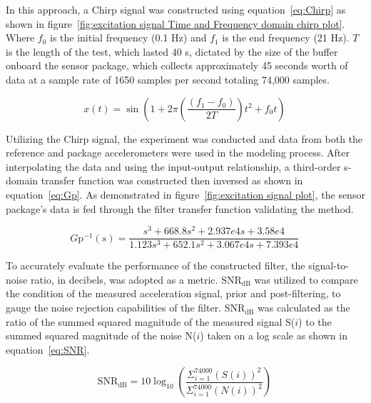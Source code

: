 \documentclass[]{spie}  %
\begin{document}
	In this approach, a Chirp signal was constructed using equation~\ref{eq:Chirp} as shown in figure~\ref{fig:excitation signal Time and Frequency domain chirp plot}. Where $f_0$ is the initial frequency (0.1 Hz) and $f_1$ is the end frequency (21 Hz). $T$ is the length of the test, which lasted 40 s, dictated by the size of the buffer onboard the sensor package, which collects approximately 45 seconds worth of data at a sample rate of 1650 samples per second totaling 74,000 samples.
	
	\begin{equation} 
		\label{eq:Chirp}
		x(t)=\sin(1 + 2\pi ( \frac{(f_1-f_0)}{2T} ) t^2 + f_0 t) \, 
	\end{equation}
	

	
	Utilizing the Chirp signal, the experiment was conducted and data from both the reference and package accelerometers were used in the modeling process. After interpolating the data and using the input-output relationship, a third-order s-domain transfer function was constructed then inversed as shown in equation~\ref{eq:Gp}. As demonstrated in figure~\ref{fig:excitation signal plot}, the sensor package's data is fed through the filter transfer function validating the method. 
	
	\begin{equation}
		\label{eq:Gp}
			G\text{p}^{-1}(s) = \frac{s^3  + 668.8 s^2  + 2.937e4 s + 3.58e4}{1.123 s^3  + 652.1 s^2  + 3.067e4 s + 7.393e4} \,
	\end{equation}

To accurately evaluate the performance of the constructed filter, the signal-to-noise ratio, in decibels, was adopted as a metric. $\text{SNR}_{\text{dB}}$ was utilized to compare the condition of the measured acceleration signal, prior and post-filtering, to gauge the noise rejection capabilities of the filter. $\text{SNR}_{\text{dB}}$ was calculated as the ratio of the summed squared magnitude of the measured signal S($i$) to the summed squared magnitude of the noise N($i$) taken on a log scale as shown in equation~\ref{eq:SNR}.~\cite{Johnson2006}

	\begin{equation}
		\label{eq:SNR}
		\text{SNR}_{\text{dB}} =10 \log_{10}(\frac{\Sigma^{74000}_{i=1}(S(i))^2}{\Sigma^{74000}_{i=1}(N(i))^2}) \, 
	\end{equation}
\end{document}

